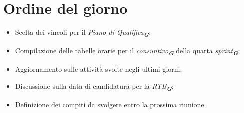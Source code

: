 

\section{Ordine del giorno}

\begin{itemize}
    \item Scelta dei vincoli per il \emph{Piano di Qualifica}\textsubscript{\textit{\textbf{G}}};
    \item Compilazione delle tabelle orarie per il \emph{consuntivo}\textsubscript{\textit{\textbf{G}}} della quarta \emph{sprint}\textsubscript{\textit{\textbf{G}}};
    \item Aggiornamento sulle attività svolte negli ultimi giorni;
    \item Discussione sulla data di candidatura per la \emph{RTB}\textsubscript{\textit{\textbf{G}}};
    \item Definizione dei compiti da svolgere entro la prossima riunione.
\end{itemize}